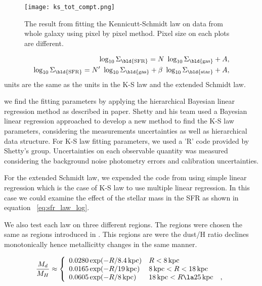 \documentclass[useAMS,usenatbib]{mn2e}
\newcommand \kpc        {\,{\rm kpc}}
\newcommand \eqsigmagas    {\Sigma_{\rm \bld {gas }}}
\newcommand \eqsigmasfr     {\Sigma_{\rm \bld {SFR }}}
\newcommand \eqsigmastar    {\Sigma_{\rm \bld {star }}}
\newcommand \eqnprime {N^\prime}
\begin{document}
\begin{figure*}
\centering
\texttt{[image: ks\_tot\_compt.png]}
\caption{The result from fitting the Kennicutt-Schmidt law on data from whole galaxy using pixel by pixel method. Pixel size on each plots are different. } %
\label{fig:ks,tot}
\end{figure*}


\begin{subequations}
\begin{align}
\label{eq:sfr_law_log}
\log_{10} \eqsigmasfr = N~\log_{10} \eqsigmagas + A, \\
\log_{10} \eqsigmasfr = \eqnprime~\log_{10} \eqsigmagas + \beta~\log_{10}\eqsigmastar  + A,\\
\end{align}
\end{subequations}
units are the same as the units in the K-S law and the extended Schmidt law.

we find the fitting parameters by applying the hierarchical Bayesian linear regression method as described in \cite{Shetty13} paper. Shetty and his team used a Bayesian linear regression approached to develop a new method to find the K-S law parameters, considering the measurements uncertainties as well as hierarchical data structure. For K-S law fitting parameters, we used a 'R' code provided by Shetty's group. Uncertainties on each observable quantity was measured considering the background noise photometry errors and calibration uncertainties.%

For the extended Schmidt law, we expended the code from using simple linear regression which is the case of K-S law to use multiple linear regression. In this case we could examine the effect of the stellar mass in the SFR as shown in equation ~\ref{eq:sfr_law_log}.

We also test each law on three different regions. The regions were chosen the same as regions introduced in \cite{Drain14}. This regions are were the dust/H ratio declines monotonically hence metallicitty changes in the same manner.  %

\begin{equation}
\label{eq:dust2gas_vs_R}
\frac{M_d}{M_H} \approx
\left\{ \begin{array}{l l}
0.0280 \exp(-R/8.4\kpc)  & R< 8\kpc\\
0.0165 \exp(-R/19\kpc)   & 8\kpc < R < 18\kpc\\
0.0605 \exp(-R/8\kpc)    & 18\kpc < R \la 25\kpc ~~~,\\
\end{array}
\right.
\end{equation}
\end{document}
